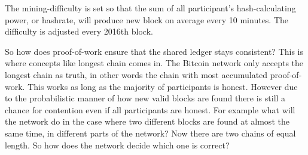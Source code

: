 The mining-difficulty is set so that the sum of all participant's hash-calculating power,
or hashrate, will produce  new block on average every 10 minutes. The difficulty is adjusted 
every 2016th block. 

So how does proof-of-work ensure that the shared ledger stays consistent? This is
where concepts like longest chain comes in. The Bitcoin network only accepts the longest
chain as truth, in other words the chain with most accumulated proof-of-work. 
This works as long as the majority of participants is honest. However due to the
probabilistic manner of how new valid blocks are found there is still a chance for 
contention even if all participants are honest. For example what will the network do
in the case where two different blocks are found at almost the same time, in 
different parts of the network? Now 
there are two chains of equal length. So how does the network decide which one
is correct?


